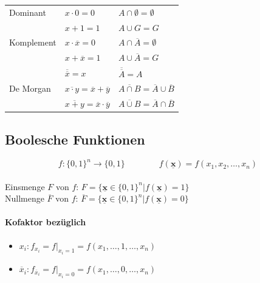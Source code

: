 \documentclass[6pt,a4paper]{scrartcl}
\renewcommand{\vec}[1]{\ensuremath{\underline{\boldsymbol {#1}}}}
\newcommand{\ra}[0]{\ensuremath{\rightarrow}} 									%
\renewcommand{\vec}[1]{\ensuremath{\underline{\boldsymbol {#1}}}}
\begin{document}
\begin{multicols*}{3}
\begin{tabular}{l|l|l}
		Dominant    & $x \cdot 0 = 0$                                       & $A \cap \emptyset = \emptyset$                        \\
		            & $x + 1 = 1$                                           & $A \cup G = G$                                        \\
		Komplement  & $x \cdot \overline{x} = 0$                            & $A \cap \overline{A} = \emptyset$                     \\
		            & $x + \overline{x} = 1$                                & $A \cup \overline{A} = G$                             \\
		            & $\overline{\overline{x}} = x$                         & $\overline{\overline{A}} = A$                         \\
		De Morgan   & $\overline{x \cdot y} = \overline{x} + \overline{y}$  & $\overline{A \cap B} = \overline{A} \cup \overline{B}$\\
		            & $\overline{x + y} = \overline{x} \cdot \overline{y}$ & $\overline{A \cup B} = \overline{A} \cap \overline{B}$
	\end{tabular}


	\subsection{Boolesche Funktionen}	
	\begin{equation*}
	f:\{0,1\}^n\ra \{0,1\} \qquad \qquad f(\vec{x})=f(x_1,x_2,\dots,x_n) 
	\end{equation*} \\
	Einsmenge $F$ von $f$: $F=\{\vec{x}\in \{0,1\}^n|f(\vec{x})=1\}$ \\
	Nullmenge $\overline F$ von $f$: $\overline F=\{\vec{x}\in \{0,1\}^n|f(\vec{x})=0\}$
	\paragraph{Kofaktor bezüglich}
	\begin{itemize}\itemsep0pt
	\item $x_i: f_{x_i}=f|_{x_i=1}=f(x_1,\dots,1,\dots,x_n)$
	\item $\overline x_i: f_{\overline x_i}=f|_{x_i=0}=f(x_1,\dots,0,\dots,x_n)$
	\end{itemize}

\end{multicols*}
\end{document}
